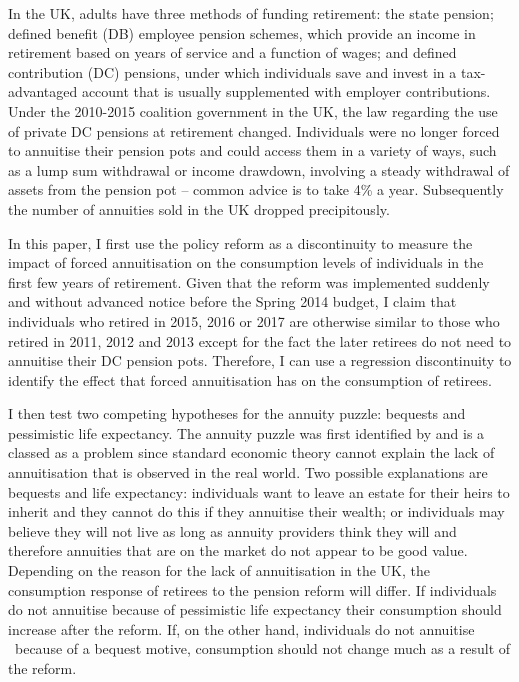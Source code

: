 \documentclass[12pt]{article}
\begin{document}
In the UK, adults have three methods of funding retirement: the state pension;
defined benefit (DB) employee pension schemes, which provide an income in
retirement based on years of service and a function of wages; and defined
contribution (DC) pensions, under which individuals save and invest in a
tax-advantaged account that is usually supplemented with employer contributions.
Under the 2010-2015 coalition government in the UK, the law regarding the use of
private DC pensions at retirement changed. Individuals were no longer forced to
annuitise their pension pots and could access them in a variety of ways, such as
a lump sum withdrawal or income drawdown, involving a steady withdrawal of
assets from the pension pot -- common advice is to take 4\% a year. Subsequently
the number of annuities sold in the UK dropped precipitously.

In this paper, I first use the policy reform as a discontinuity to measure the
impact of forced annuitisation on the consumption levels of individuals in the
first few years of retirement. Given that the reform was implemented suddenly
and without advanced notice before the Spring 2014 budget, I claim that
individuals who retired in 2015, 2016 or 2017 are otherwise similar to those who
retired in 2011, 2012 and 2013 except for the fact the later retirees do not
need to annuitise their DC pension pots. Therefore, I can use a regression
discontinuity to identify the effect that forced annuitisation has on the
consumption of retirees.

I then test two competing hypotheses for the annuity puzzle: bequests and
pessimistic life expectancy. The annuity puzzle was first identified by
\cite{yaari_65} and is a classed as a problem since standard economic theory
cannot explain the lack of annuitisation that is observed in the real world. Two
possible explanations are bequests and life expectancy: individuals want to
leave an estate for their heirs to inherit and they cannot do this if they
annuitise their wealth; or individuals may believe they will not live as long as
annuity providers think they will and therefore annuities that are on the market
do not appear to be good value. Depending on the reason for the lack of
annuitisation in the UK, the consumption response of retirees to the pension
reform will differ. If individuals do not annuitise because of pessimistic life
expectancy their consumption should increase after the reform. If, on the other
hand, individuals do not annuitise \ because of a bequest motive, consumption
should not change much as a result of the reform.
\end{document}
